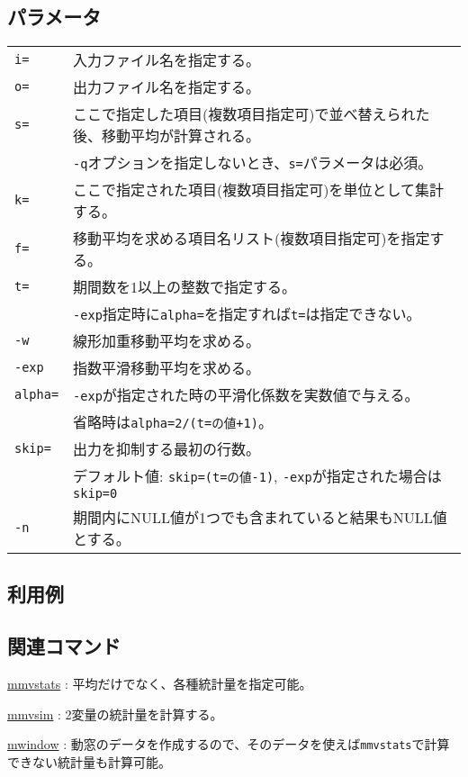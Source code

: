 \subsection*{パラメータ}
\begin{table}[htbp]
{\small
\begin{tabular}{ll}
\verb|i=|    & 入力ファイル名を指定する。\\
\verb|o=|    & 出力ファイル名を指定する。\\
\verb|s=|    & ここで指定した項目(複数項目指定可)で並べ替えられた後、移動平均が計算される。\\
             & \verb|-q|オプションを指定しないとき、\verb|s=|パラメータは必須。\\
\verb|k=|    & ここで指定された項目(複数項目指定可)を単位として集計する。 \\
\verb|f=|    & 移動平均を求める項目名リスト(複数項目指定可)を指定する。\\
\verb|t=|    & 期間数を1以上の整数で指定する。 \\
             & \verb|-exp|指定時に\verb|alpha=|を指定すれば\verb|t=|は指定できない。\\
\verb|-w|    & 線形加重移動平均を求める。\\
\verb|-exp|  & 指数平滑移動平均を求める。\\
\verb|alpha=|& \verb|-exp|が指定された時の平滑化係数を実数値で与える。\\
             & 省略時は\verb|alpha=2/(t=の値+1)|。\\
\verb|skip=| & 出力を抑制する最初の行数。\\
             & デフォルト値: \verb|skip=(t=の値-1)|, \verb|-exp|が指定された場合は\verb|skip=0| \\
\verb|-n| & 期間内にNULL値が1つでも含まれていると結果もNULL値とする。 \\
\end{tabular} 
}
\end{table} 


\subsection*{利用例}

\subsection*{関連コマンド}
\hyperref[sect:mmvstats] {mmvstats} : 平均だけでなく、各種統計量を指定可能。

\hyperref[sect:mmvsim] {mmvsim} : 2変量の統計量を計算する。

\hyperref[sect:mwindow] {mwindow} : 動窓のデータを作成するので、そのデータを使えば\verb|mmvstats|で計算できない統計量も計算可能。

%
